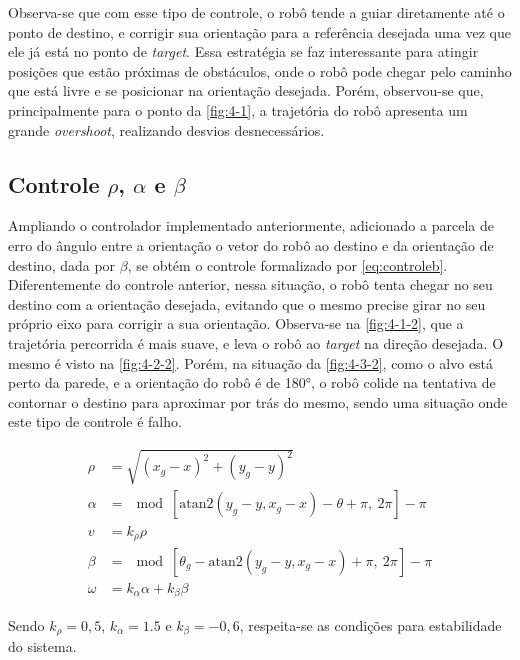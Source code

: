 Observa-se que com esse tipo de controle, o robô tende a guiar diretamente até o ponto de destino, e corrigir sua orientação para a referência desejada uma vez que ele já está no ponto de \textit{target}. Essa estratégia se faz interessante para atingir posições que estão próximas de obstáculos, onde o robô pode chegar pelo caminho que está livre e se posicionar na orientação desejada. Porém, observou-se que, principalmente para o ponto da \autoref{fig:4-1}, a trajetória do robô apresenta um grande \textit{overshoot}, realizando desvios desnecessários.


\subsection{Controle $\rho$, $\alpha$ e $\beta$}

Ampliando o controlador implementado anteriormente, adicionado a parcela de erro do ângulo entre a orientação o vetor do robô ao destino e da orientação de destino, dada por $\beta$, se obtém o controle formalizado por \eqref{eq:controleb}. Diferentemente do controle anterior, nessa situação, o robô tenta chegar no seu destino com a orientação desejada, evitando que o mesmo precise girar no seu próprio eixo para corrigir a sua orientação. Observa-se na \autoref{fig:4-1-2}, que a trajetória percorrida é mais suave, e leva o robô ao \textit{target} na direção desejada. O mesmo é visto na \autoref{fig:4-2-2}. Porém, na situação da \autoref{fig:4-3-2}, como o alvo está perto da parede, e a orientação do robô é de 180°, o robô colide na tentativa de contornar o destino para aproximar por trás do mesmo, sendo uma situação onde este tipo de controle é falho.



\begin{equation}\label{eq:controleb}
\begin{split}
	\rho &= \sqrt{(x_g-x)^2 + (y_g-y)^2} \\
	\alpha& = \mod \left[\text{atan2}\left(y_g-y,x_g-x\right) - \theta + \pi, \ 2\pi \right] -\pi \\
	v &= k_\rho\rho \\
	\beta &= \mod \left[\theta_g - \text{atan2}\left(y_g-y,x_g-x\right)+ \pi, \ 2\pi \right] -\pi \\
	\omega &= k_\alpha\alpha + k_\beta\beta
\end{split}
\end{equation}

Sendo $k_\rho = 0,5$,  $k_\alpha = 1.5$ e $k_\beta = -0,6$, respeita-se as condições para estabilidade do sistema.


